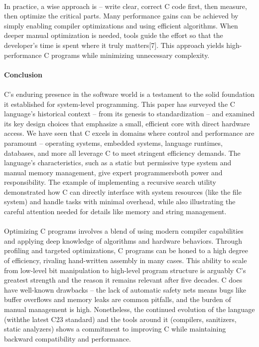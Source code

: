 \documentclass{article}
\begin{document}
\\
{\normalsize In practice, a wise approach is – write clear, correct C code first, then measure, then optimize the critical part}{\normalsize s. Many performance gains can be achieved by simply enabling compiler optimizations and using efficient algorithms. When deeper manual optimization is needed, tools guide the effort so that the developer’s time is spent where it truly }{\normalsize matters[}{\normalsize 7]. This appr}{\normalsize oach yields high-performance C programs while minimizing unnecessary complexity.}\\
\\
{\Large \textbf{Conclusion}}\\
\\
{\normalsize C’s enduring presence in the software world is a testament to the solid foundation it established for system-level programming. This paper has surveyed the C lang}{\normalsize uage’s historical context – from its genesis to standardization – and examined its key design choices that emphasize a small, efficient core with direct hardware access. We have seen that C excels in domains where control and performance are paramount – op}{\normalsize erating systems, embedded systems, language runtimes, databases, and more all leverage C to meet stringent efficiency demands. The language’s characteristics, such as a static but permissive type system and manual memory management, give expert programmers}{\normalsize  both power and responsibility. The example of implementing a recursive search utility demonstrated how C can directly interface with system resources (like the file system) and handle tasks with minimal overhead, while also illustrating the careful attent}{\normalsize ion needed for details like memory and string management.}\\
\\
{\normalsize Optimizing C programs involves a blend of using modern compiler capabilities and applying deep knowledge of algorithms and hardware behaviors. Through profiling and targeted optimizations, C progra}{\normalsize ms can be honed to a high degree of efficiency, rivaling hand-written assembly in many cases. This ability to scale from low-level bit manipulation to high-level program structure is arguably C’s greatest strength and the reason it remains relevant after f}{\normalsize ive decades. C does have well-known drawbacks – the lack of automatic safety nets means bugs like buffer overflows and memory leaks are common pitfalls, and the burden of manual management is high. Nonetheless, the continued evolution of the language (with}{\normalsize  the latest C23 standard) and the tools around it (compilers, sanitizers, static analyzers) shows a commitment to improving C while maintaining backward compatibility and performance.}\\
\end{document}

